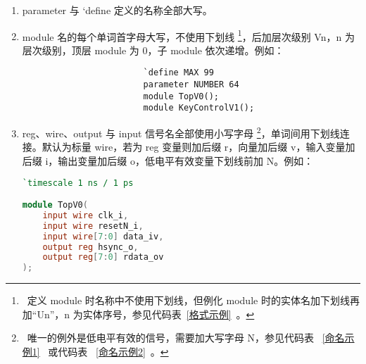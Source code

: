 \documentclass[utf-8, 10pt, a4paper, titlepage, oneside, onecolumn, openany]{ctexart} %
\begin{document}
		\begin{enumerate}
			\item parameter 与  {`}define 定义的名称全部大写。 %
			
			\item module 名的每个单词首字母大写，不使用下划线 \footnote{~定义 module 时名称中不使用下划线，但例化 module 时的实体名加下划线再加“Un”，n 为实体序号，参见代码表~\ref{格式示例}~。}，后加层次级别 Vn，n 为层次级别，顶层 module 为 0，子 module 依次递增。例如：

				\begin{table}[h]
					\caption{命名示例 0} \label{命名示例0}
				\end{table}

				\begin{shaded}
					\begin{verbatim}
						`define MAX 99
						parameter NUMBER 64
						module TopV0();
						module KeyControlV1();
					\end{verbatim}
				\end{shaded}

			\item reg、wire、output 与 input 信号名全部使用小写字母 \footnote{~唯一的例外是低电平有效的信号，需要加大写字母 N，参见代码表 ~\ref{命名示例1}~ 或代码表 ~\ref{命名示例2}~。}，单词间用下划线连接。默认为标量 wire，若为 reg 变量则加后缀 r，向量加后缀 v，输入变量加后缀 i，输出变量加后缀 o，低电平有效变量下划线前加 N。例如：
			
			\clearpage

				\begin{table}[h]
					\caption{命名示例 1} \label{命名示例1}
				\end{table}

\begin{lstlisting}[language = Verilog]
`timescale 1 ns / 1 ps

module TopV0(
	input wire clk_i,
	input wire resetN_i,
	input wire[7:0] data_iv,
	output reg hsync_o,
	output reg[7:0] rdata_ov
);
\end{lstlisting}

				\begin{table}[h]
					\caption{命名示例 2} \label{命名示例2}
				\end{table}


\end{enumerate}
\end{document}
